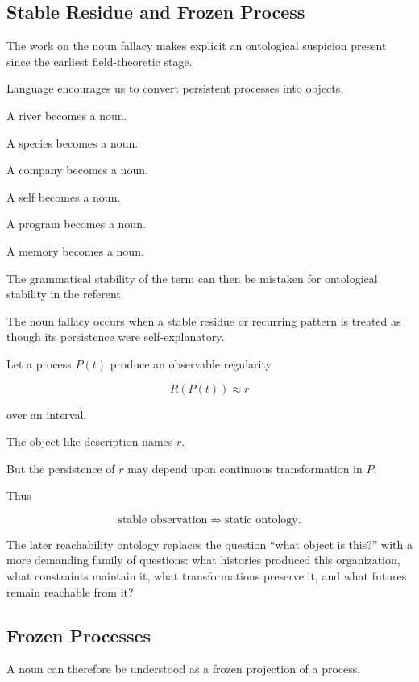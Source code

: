 \documentclass[11pt]{article}
\theoremstyle{remark}
\begin{document}
\subsection{Stable Residue and Frozen Process}

The work on the noun fallacy makes explicit an ontological suspicion present since the earliest field-theoretic stage.

Language encourages us to convert persistent processes into objects.

A river becomes a noun.

A species becomes a noun.

A company becomes a noun.

A self becomes a noun.

A program becomes a noun.

A memory becomes a noun.

The grammatical stability of the term can then be mistaken for ontological stability in the referent.

The noun fallacy occurs when a stable residue or recurring pattern is treated as though its persistence were self-explanatory.

Let a process $P(t)$ produce an observable regularity

\begin{equation}
R(P(t))\approx r
\end{equation}

over an interval.

The object-like description names $r$.

But the persistence of $r$ may depend upon continuous transformation in $P$.

Thus

\begin{equation}
\text{stable observation}
\not\Rightarrow
\text{static ontology}.
\end{equation}

The later reachability ontology replaces the question ``what object is this?'' with a more demanding family of questions: what histories produced this organization, what constraints maintain it, what transformations preserve it, and what futures remain reachable from it?

\subsection{Frozen Processes}

A noun can therefore be understood as a frozen projection of a process.
\end{document}
